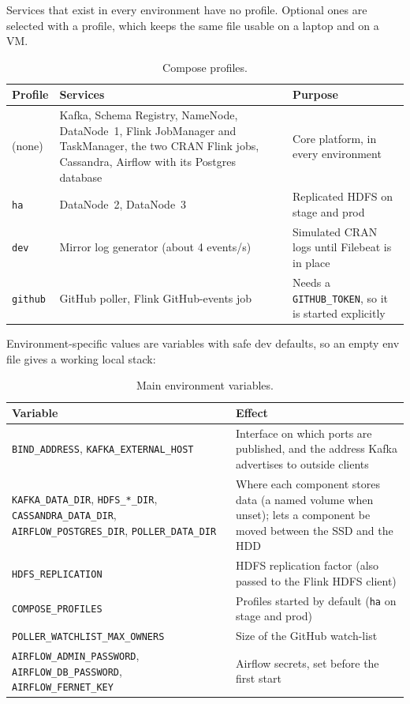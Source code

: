 \documentclass[11pt,a4paper]{article}
\begin{document}
Services that exist in every environment have no profile. Optional ones are selected with a profile, which keeps the same file usable
on a laptop and on a VM.

\begin{table}[htbp]
\centering
\caption{Compose profiles.}
\small
\begin{tabularx}{\textwidth}{@{}L{1.8cm}L{6.2cm}Y@{}}
\toprule
\textbf{Profile} & \textbf{Services} & \textbf{Purpose} \\
\midrule
(none) & Kafka, Schema Registry, NameNode, DataNode~1, Flink JobManager and TaskManager, the two CRAN Flink jobs, Cassandra, Airflow with its Postgres database & Core platform, in every environment \\
\texttt{ha} & DataNode~2, DataNode~3 & Replicated HDFS on stage and prod \\
\texttt{dev} & Mirror log generator (about 4 events/s) & Simulated CRAN logs until Filebeat is in place \\
\texttt{github} & GitHub poller, Flink GitHub-events job & Needs a \texttt{GITHUB\_TOKEN}, so it is started explicitly \\
\bottomrule
\end{tabularx}
\end{table}

Environment-specific values are variables with safe dev defaults, so an empty env file gives a working local stack:

\begin{table}[htbp]
\centering
\caption{Main environment variables.}
\small
\begin{tabularx}{\textwidth}{@{}L{5.2cm}Y@{}}
\toprule
\textbf{Variable} & \textbf{Effect} \\
\midrule
\texttt{BIND\_ADDRESS}, \texttt{KAFKA\_EXTERNAL\_HOST} & Interface on which ports are published, and the address Kafka advertises to outside clients \\
\texttt{KAFKA\_DATA\_DIR}, \texttt{HDFS\_*\_DIR}, \texttt{CASSANDRA\_DATA\_DIR}, \texttt{AIRFLOW\_POSTGRES\_DIR}, \texttt{POLLER\_DATA\_DIR} & Where each component stores data (a named volume when unset); lets a component be moved between the SSD and the HDD \\
\texttt{HDFS\_REPLICATION} & HDFS replication factor (also passed to the Flink HDFS client) \\
\texttt{COMPOSE\_PROFILES} & Profiles started by default (\texttt{ha} on stage and prod) \\
\texttt{POLLER\_WATCHLIST\_MAX\_OWNERS} & Size of the GitHub watch-list \\
\texttt{AIRFLOW\_ADMIN\_PASSWORD}, \texttt{AIRFLOW\_DB\_PASSWORD}, \texttt{AIRFLOW\_FERNET\_KEY} & Airflow secrets, set before the first start \\
\bottomrule
\end{tabularx}
\end{table}
\end{document}
